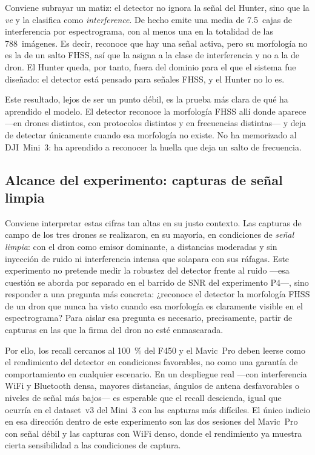 Conviene subrayar un matiz: el detector no ignora la señal del Hunter, sino que la \emph{ve} y la clasifica como \emph{interference}. De hecho emite una media de \num{7,5}~cajas de interferencia por espectrograma, con al menos una en la totalidad de las \num{788}~imágenes. Es decir, reconoce que hay una señal activa, pero su morfología no es la de un salto FHSS, así que la asigna a la clase de interferencia y no a la de dron. El Hunter queda, por tanto, fuera del dominio para el que el sistema fue diseñado: el detector está pensado para señales FHSS, y el Hunter no lo es.

Este resultado, lejos de ser un punto débil, es la prueba más clara de qué ha aprendido el modelo. El detector reconoce la morfología FHSS allí donde aparece ---en drones distintos, con protocolos distintos y en frecuencias distintas--- y deja de detectar únicamente cuando esa morfología no existe. No ha memorizado al DJI~Mini~3: ha aprendido a reconocer la huella que deja un salto de frecuencia.

\subsection{Alcance del experimento: capturas de señal limpia}
\label{sec:zeroshot_alcance}

Conviene interpretar estas cifras tan altas en su justo contexto. Las capturas de campo de los tres drones se realizaron, en su mayoría, en condiciones de \emph{señal limpia}: con el dron como emisor dominante, a distancias moderadas y sin inyección de ruido ni interferencia intensa que solapara con sus ráfagas. Este experimento no pretende medir la robustez del detector frente al ruido ---esa cuestión se aborda por separado en el barrido de SNR del experimento P4---, sino responder a una pregunta más concreta: ¿reconoce el detector la morfología FHSS de un dron que nunca ha visto cuando esa morfología es claramente visible en el espectrograma? Para aislar esa pregunta es necesario, precisamente, partir de capturas en las que la firma del dron no esté enmascarada.

Por ello, los recall cercanos al \SI{100}{\percent} del F450 y el Mavic~Pro deben leerse como el rendimiento del detector en condiciones favorables, no como una garantía de comportamiento en cualquier escenario. En un despliegue real ---con interferencia WiFi y Bluetooth densa, mayores distancias, ángulos de antena desfavorables o niveles de señal más bajos--- es esperable que el recall descienda, igual que ocurría en el dataset~v3 del Mini~3 con las capturas más difíciles. El único indicio en esa dirección dentro de este experimento son las dos sesiones del Mavic~Pro con señal débil y las capturas con WiFi denso, donde el rendimiento ya muestra cierta sensibilidad a las condiciones de captura.

